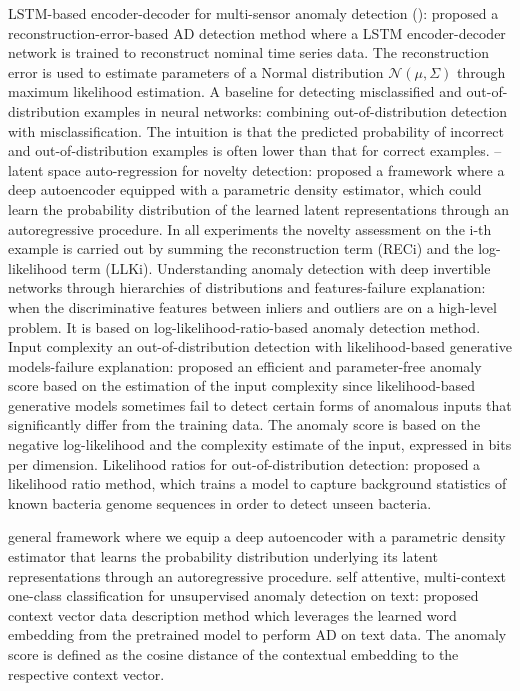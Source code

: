 \documentclass[pmlr]{jmlr}%
\begin{document}
\cite{malhotra2016lstm} LSTM-based encoder-decoder for multi-sensor anomaly detection (): proposed a reconstruction-error-based AD detection method where a LSTM encoder-decoder network is trained to reconstruct nominal time series data. The reconstruction error is used to estimate parameters of a Normal distribution $\mathcal{N}(\mu, \Sigma)$ through maximum likelihood estimation.
\cite{hendrycks2016baseline} A baseline for detecting misclassified and out-of-distribution examples in neural networks: combining out-of-distribution detection with misclassification. The intuition is that the predicted probability of incorrect and out-of-distribution examples is often lower than that for correct examples.
\cite{abati2019latent}--latent space auto-regression for novelty detection: proposed a framework where a deep autoencoder equipped with a parametric density estimator, which could learn the probability distribution of the learned latent representations through an autoregressive procedure. In all experiments the novelty assessment on the i-th example is carried out by summing the reconstruction term (RECi) and the log-likelihood term (LLKi).
\cite{schirrmeister2020understanding} Understanding anomaly detection with deep invertible networks through hierarchies of distributions and features-failure explanation: when the discriminative features between inliers and outliers are on a high-level problem. It is based on log-likelihood-ratio-based anomaly detection method.
\cite{serra2019input} Input complexity an out-of-distribution detection with likelihood-based generative models-failure explanation: proposed an efficient and parameter-free anomaly score based on the estimation of the input complexity since likelihood-based generative models sometimes fail to detect certain forms of anomalous inputs that significantly differ from the training data. The anomaly score is based on the negative log-likelihood and the complexity estimate of the input, expressed in bits per dimension.
\cite{ren2019likelihood} %
Likelihood ratios for out-of-distribution detection: proposed a likelihood ratio method, which trains a model to capture background statistics of known bacteria genome sequences in order to detect unseen bacteria. 

\cite{abati2019latent} general framework where we equip a deep autoencoder with a parametric density estimator that learns the probability distribution underlying its latent representations through an autoregressive procedure.
\cite{ruff2019self} self attentive, multi-context one-class classification for unsupervised anomaly detection on text: proposed context vector data description method which leverages the learned word embedding from the pretrained model to perform AD on text data. The anomaly score is defined as the cosine distance of the contextual embedding to the respective context vector.
\end{document}
